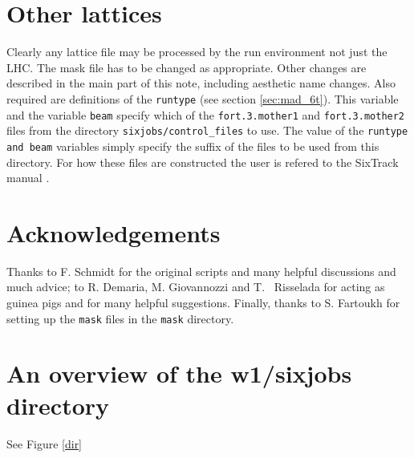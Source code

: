 \documentclass{article}    %
\begin{document}
\section{Other lattices}
\label{sec:otherlattices}

Clearly any lattice file may be processed by the run environment not
just the LHC. The mask file has to be changed as appropriate.
Other changes are described in the main part of this
note, including aesthetic name changes. Also required are definitions
of the {\tt runtype} (see section \ref{sec:mad_6t}). This variable
and the variable {\tt beam} specify which of the {\tt fort.3.mother1} and {\tt fort.3.mother2}
files from the directory {\tt sixjobs/control\_files}
to use. The value of the {\tt runtype and beam} variables simply specify the suffix
of the files to be used from this directory. For how these files are
constructed the user is refered to the SixTrack manual \cite{SixTrack}.
\section{Acknowledgements}
Thanks to F. Schmidt for the original scripts and many helpful discussions
and much advice; to R. Demaria, M. Giovannozzi and T. ~Risselada
for acting as guinea pigs and for many helpful suggestions.
Finally, thanks to S. Fartoukh for setting up the {\tt mask} files in
the {\tt mask} directory.

\begin{figure*}[tb]
\centering
\caption{Example of fu problems.}
\label{dir}
\end{figure*}

\appendix
\section{An overview of the w1/sixjobs directory}
\label{sec:commands}
See Figure \ref{dir}
\end{document}
